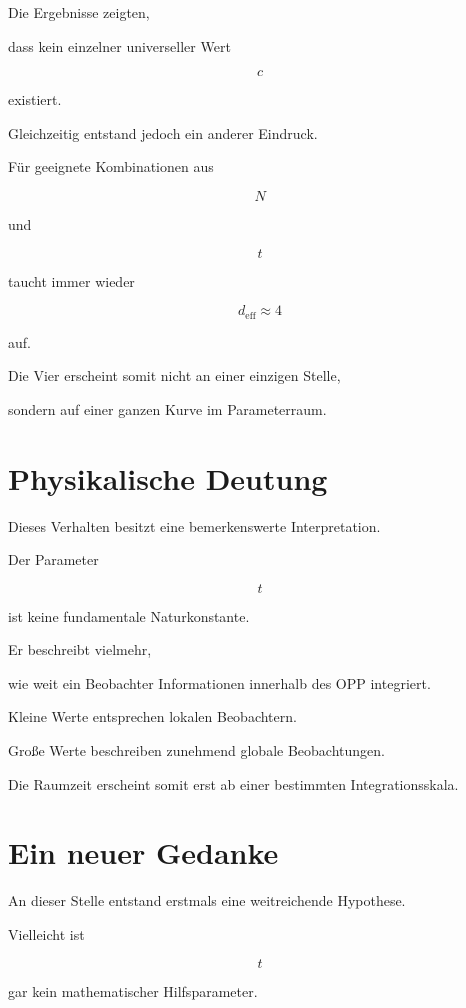 Die Ergebnisse zeigten,

dass kein einzelner universeller Wert

\[
c
\]

existiert.

Gleichzeitig entstand jedoch ein anderer Eindruck.

Für geeignete Kombinationen aus

\[
N
\]

und

\[
t
\]

taucht immer wieder

\[
d_{\mathrm{eff}}
\approx
4
\]

auf.

Die Vier erscheint somit nicht an einer einzigen Stelle,

sondern auf einer ganzen Kurve im Parameterraum.


\section*{Physikalische Deutung}

Dieses Verhalten besitzt eine bemerkenswerte Interpretation.

Der Parameter

\[
t
\]

ist keine fundamentale Naturkonstante.

Er beschreibt vielmehr,

wie weit ein Beobachter Informationen innerhalb des OPP integriert.

Kleine Werte entsprechen lokalen Beobachtern.

Große Werte beschreiben zunehmend globale Beobachtungen.

Die Raumzeit erscheint somit erst ab einer bestimmten Integrationsskala.


\section*{Ein neuer Gedanke}

An dieser Stelle entstand erstmals eine weitreichende Hypothese.

Vielleicht ist

\[
t
\]

gar kein mathematischer Hilfsparameter.

